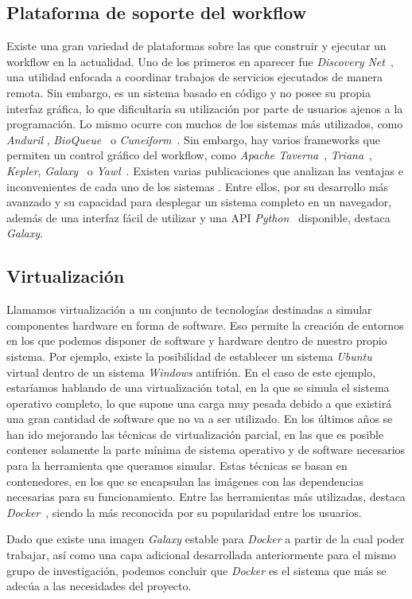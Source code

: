 \subsection{Plataforma de soporte del workflow}
Existe una gran variedad de plataformas sobre las que construir y ejecutar un workflow en la actualidad. Uno de los primeros en aparecer fue \textit{Discovery Net}~\cite{Curcin:2002:DNT:775047.775145}, una utilidad enfocada a coordinar trabajos de servicios ejecutados de manera remota. Sin embargo, es un sistema basado en código y no posee su propia interfaz gráfica, lo que dificultaría su utilización por parte de usuarios ajenos a la programación. Lo mismo ocurre con muchos de los sistemas más utilizados, como \textit{Anduril} \cite{Ovaska2010}, \textit{BioQueue}~ \cite{10.1093/bioinformatics/btx403} o \textit{Cuneiform}~\cite{brandt_reisig_leser_2017}. Sin embargo, hay varios frameworks que permiten un control gráfico del workflow, como \textit{Apache Taverna}~\cite{10.1093/nar/gkt328}, \textit{Triana}~\cite{Taylor2007}, \textit{Kepler}\cite{Ludascher:2006:SWM:1148437.1148454}, \textit{Galaxy}~\cite{Galaxy} o \textit{Yawl}~\cite{yawl2004}. Existen varias publicaciones que analizan las ventajas e inconvenientes de cada uno de los sistemas \cite{4786077, Abouelhoda:2010:MPI:1833398.1833400, Nyronen:2012:DII:2361999.2362006, 10.1093/bib/bbw020}. Entre ellos, por su desarrollo más avanzado y su capacidad para desplegar un sistema completo en un navegador, además de una interfaz fácil de utilizar y una API \textit{Python}~\cite{GalaxyAPI} disponible, destaca \textit{Galaxy}.

\subsection{Virtualización}
Llamamos virtualización a un conjunto de tecnologías destinadas a simular componentes hardware en forma de software. Eso permite la creación de entornos en los que podemos disponer de software y hardware dentro de nuestro propio sistema. Por ejemplo, existe la posibilidad de establecer un sistema \textit{Ubuntu} virtual dentro de un sistema \textit{Windows} antifrión. En el caso de este ejemplo, estaríamos hablando de una virtualización total, en la que se simula el sistema operativo completo, lo que supone una carga muy pesada debido a que existirá una gran cantidad de software que no va a ser utilizado. En los últimos años se han ido mejorando las técnicas de virtualización parcial, en las que es posible contener solamente la parte mínima de sistema operativo y de software necesarios para la herramienta que queramos simular. Estas técnicas se basan en contenedores, en los que se encapsulan las imágenes con las dependencias necesarias para su funcionamiento. Entre las herramientas más utilizadas, destaca \textit{Docker}~\cite{Docker}, siendo la más reconocida por su popularidad entre los usuarios.

Dado que existe una imagen \textit{Galaxy} estable para \textit{Docker} a partir de la cual poder trabajar, así como una capa adicional desarrollada anteriormente para el mismo grupo de investigación, podemos concluir que \textit{Docker} es el sistema que más se adecúa a las necesidades del proyecto.


\newpage \thispagestyle{empty} %